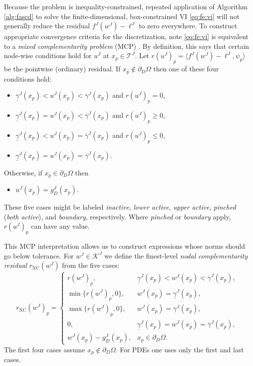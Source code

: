 \documentclass[letterpaper,final,12pt,reqno]{amsart}
\theoremstyle{cstyle}
\theoremstyle{cstyle*}
\theoremstyle{dstyle}
\numberwithin{equation}{section}
\numberwithin{figure}{section}
\numberwithin{table}{section}
\numberwithin{theorem}{section}
\newcommand{\ip}[2]{\langle#1,#2\rangle}
\newcommand{\rNC}{r_{\text{NC}}}
\begin{document}
Because the problem is inequality-constrained, repeated application of Algorithm \ref{alg:fascd} to solve the finite-dimensional, box-constrained VI \eqref{eq:fe:vi} will not generally reduce the residual $f^J(w^J) - \ell^J$ to zero everywhere.  To construct appropriate convergence criteria for the discretization, note \eqref{eq:fe:vi} is equivalent to a \emph{mixed complementarity problem} (MCP) \cite{FacchineiPang2003}.  By definition, this says that certain node-wise conditions hold for $u^J$ at $x_p \in \mathcal{T}^J$.  Let $r(u^J)_p = \ip{f^J(w^J)-\ell^J}{\psi_p}$ be the pointwise (ordinary) residual.  If $x_p \notin \partial_D\Omega$ then one of these four conditions hold:
\begin{itemize}
\item $\underline{\gamma}^J(x_p)<u^J(x_p)<\overline{\gamma}^J(x_p)$ and $r(u^J)_p = 0$,
\item $\underline{\gamma}^J(x_p)=u^J(x_p)<\overline{\gamma}^J(x_p)$ and $r(u^J)_p \ge 0$,
\item $\underline{\gamma}^J(x_p)<u^J(x_p)=\overline{\gamma}^J(x_p)$ and $r(u^J)_p \le 0$,
\item $\underline{\gamma}^J(x_p)=u^J(x_p)=\overline{\gamma}^J(x_p)$.
\end{itemize}
Otherwise, if $x_p \in \partial_D\Omega$ then
\begin{itemize}
\item $u^J(x_p)=g_D^J(x_p)$.
\end{itemize}
These five cases might be labeled \emph{inactive}, \emph{lower active}, \emph{upper active}, \emph{pinched} (\emph{both active}), and \emph{boundary}, respectively.  Where \emph{pinched} or \emph{boundary} apply, $r(u^J)_p$ can have any value.

This MCP interpretation allows us to construct expressions whose norms should go below tolerance.  For $w^J \in \mathcal{K}^J$ we define the finest-level \emph{nodal complementarity residual} $\rNC(w^J)$ from the five cases:
\begin{equation}
\rNC(w^J)_p = \begin{cases}
    r(w^J)_p, & \underline{\gamma}^J(x_p) < w^J(x_p) < \overline{\gamma}^J(x_p), \\
    \min\{r(w^J)_p,0\}, & w^J(x_p) = \underline{\gamma}^J(x_p), \\
    \max\{r(w^J)_p,0\}, & w^J(x_p) = \overline{\gamma}^J(x_p), \\
    0, & \underline{\gamma}^J(x_p)=w^J(x_p)=\overline{\gamma}^J(x_p), \\
    w^J(x_p) - g_D^J(x_p), & x_p \in \partial_D\Omega. \end{cases} \label{eq:rNC}
\end{equation}
The first four cases assume $x_p \notin \partial_D\Omega$.  For PDEs one uses only the first and last cases.
\end{document}
